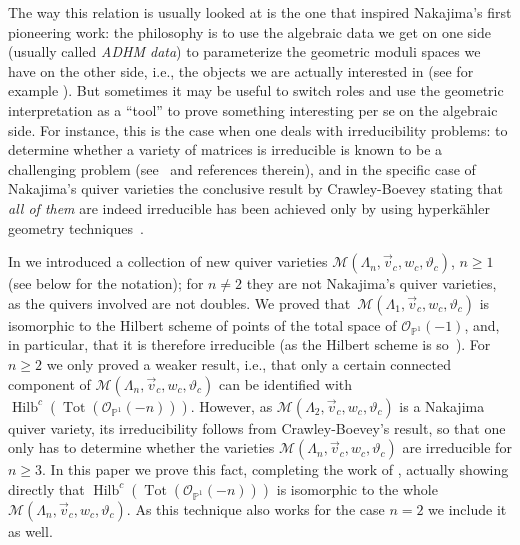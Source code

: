 \documentclass[pdftex]{sigma}
\numberwithin{equation}{section}
\begin{document}
 The way this relation is usually looked at is the one that inspired Nakajima's first pioneering work: the philosophy is to use the algebraic data we get on one side (usually called \emph{ADHM data}) to parameterize the geometric moduli spaces we have on the other side, i.e., the objects we are actually interested in (see for example \cite{BFMT, Dorey,Niki}). But sometimes it may be useful to switch roles and use the geometric interpretation as a ``tool'' to prove something interesting per se on the algebraic side. For instance, this is the case when one deals with irreducibility problems: to determine whether a variety of matrices is irreducible is known to be a challenging problem (see~\cite{Ngo-Siv} and references therein), and in the specific case of Nakajima's quiver varieties the conclusive result by Crawley-Boevey stating that \emph{all of them} are indeed irreducible has been achieved only by using hyperk\"ahler geometry techniques~\cite{CrBo}.

 In \cite{bblr} we introduced a collection of new quiver varieties $\mathcal{M} (\Lambda_n,\vec{v}_c,w_c, \vartheta_c)$, ${n\geq1}$ (see below for the notation);
 for $n\neq 2$ they are not Nakajima's quiver varieties, as the quivers involved are not doubles. We proved that~$\mathcal{M} (\Lambda_1,\vec{v}_c,w_c, \vartheta_c)$ is isomorphic to the Hilbert scheme of points of the total space of $\mathcal{O}_{\mathbb{P}^1}(-1)$, and, in particular, that it is therefore irreducible (as the Hilbert scheme is so~\cite{Fogarty}). For $n\geq 2$ we only proved a weaker result, i.e.,
 that only a certain connected component of $\mathcal{M} (\Lambda_n,\vec{v}_c,w_c, \vartheta_c)$ can be identified with $\operatorname{Hilb}^c(\operatorname{Tot}(\mathcal{O}_{\mathbb{P}^1}(-n)))$. However, as $\mathcal{M} (\Lambda_2,\vec{v}_c,w_c, \vartheta_c)$ is a Nakajima quiver variety, its irreducibility follows from Crawley-Boevey's result, so that one only has to determine whether the varieties $\mathcal{M} (\Lambda_n,\vec{v}_c,w_c, \vartheta_c)$ are irreducible for $n\geq 3$. In this paper we prove this fact, completing the work of \cite{bblr}, actually showing directly
 that $\operatorname{Hilb}^c(\operatorname{Tot}(\mathcal{O}_{\mathbb{P}^1}(-n)))$ is isomorphic to the whole
$\mathcal{M} (\Lambda_n,\vec{v}_c,w_c, \vartheta_c)$. As this technique also works for the case $n=2$ we include it as well.
\end{document}
